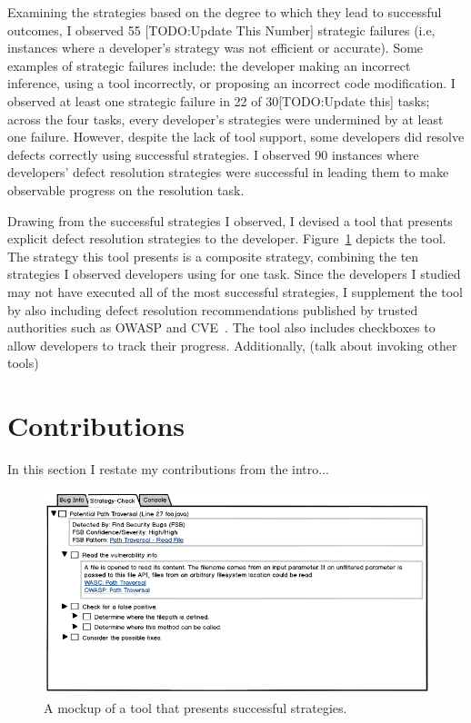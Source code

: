 \documentclass{sig-alternate}
\begin{document}
Examining the strategies based on the degree to which they lead to successful outcomes, I observed 55 [TODO:Update This Number] strategic failures (i.e, instances where a developer's strategy was not efficient or accurate). Some examples of strategic failures include: the developer making an incorrect inference, using a tool incorrectly, or proposing an incorrect code modification.
I observed at least one strategic failure in 22 of 30[TODO:Update this] tasks; across the four tasks, every developer's strategies were undermined by at least one failure.
However, despite the lack of tool support, some developers did resolve defects correctly using successful strategies. I observed 90 instances where developers' defect resolution strategies were successful in leading them to make observable progress on the resolution task.

Drawing from the successful strategies I observed, I devised a tool that presents explicit defect resolution strategies to the developer. 
Figure~\ref{fig:tool} depicts the tool.
The strategy this tool presents is a composite strategy, combining the ten strategies I observed developers using for one task.
Since the developers I studied may not have executed all of the most successful strategies, I supplement the tool by also including defect resolution recommendations published by trusted authorities such as OWASP and CVE~\cite{OWASP, CVE}.
The tool also includes checkboxes to allow developers to track their progress.
Additionally, (talk about invoking other tools)

\section{Contributions}


In this section I restate my contributions from the intro...



\begin{figure}
	\centering
	\includegraphics[width=\columnwidth]{images/toolscreenshot}
	\caption{A mockup of a tool that presents successful strategies.}
	\label{fig:tool} 
\end{figure}





%


\end{document}
